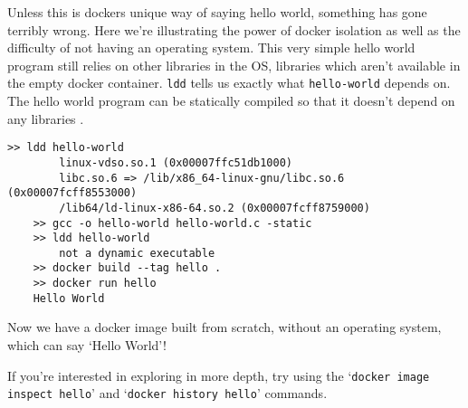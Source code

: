 Unless this is dockers unique way of saying hello world, something has gone terribly wrong.
Here we're illustrating the power of docker isolation as well as the difficulty of not having an operating system.
This very simple hello world program still relies on other libraries in the OS, libraries which aren't available in the empty docker container.
\texttt{ldd} tells us exactly what \texttt{hello-world} depends on.
The hello world program can be statically compiled so that it doesn't depend on any libraries \cite{static-hello-world}.

\begin{shaded*}
\begin{lstlisting}[language=shell]
    >> ldd hello-world
        linux-vdso.so.1 (0x00007ffc51db1000)
        libc.so.6 => /lib/x86_64-linux-gnu/libc.so.6 (0x00007fcff8553000)
        /lib64/ld-linux-x86-64.so.2 (0x00007fcff8759000)
    >> gcc -o hello-world hello-world.c -static
    >> ldd hello-world
        not a dynamic executable
    >> docker build --tag hello .
    >> docker run hello
    Hello World
\end{lstlisting}
\end{shaded*}

Now we have a docker image built from scratch, without an operating system, which can say `Hello World'!
\begin{extra}
If you're interested in exploring in more depth, try using the `\texttt{docker image inspect hello}'
and `\texttt{docker history hello}' commands.
\end{extra}



